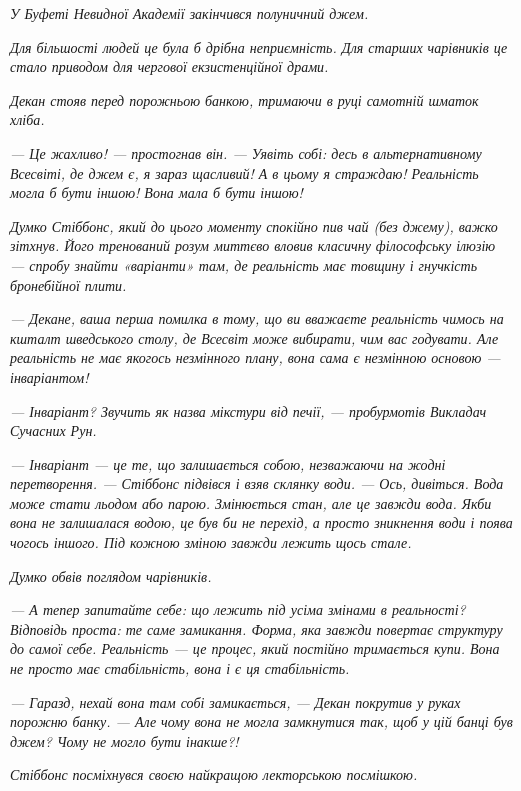 \documentclass[12pt, a4paper, openany]{book}
\begin{document}
\begin{terrybox}
\textit{У Буфеті Невидної Академії закінчився полуничний джем.}

\textit{Для більшості людей це була б дрібна неприємність. Для старших чарівників це стало приводом для чергової екзистенційної драми.}

\textit{Декан стояв перед порожньою банкою, тримаючи в руці самотній шматок хліба.}

\textit{--- Це жахливо! --- простогнав він. --- Уявіть собі: десь в альтернативному Всесвіті, де джем є, я зараз щасливий! А в цьому я страждаю! Реальність могла б бути іншою! Вона \emph{мала} б бути іншою!}

\textit{Думко Стіббонс, який до цього моменту спокійно пив чай (без джему), важко зітхнув. Його тренований розум миттєво вловив класичну філософську ілюзію --- спробу знайти «варіанти» там, де реальність має товщину і гнучкість бронебійної плити.}

\textit{--- Декане, ваша перша помилка в тому, що ви вважаєте реальність чимось на кшталт шведського столу, де Всесвіт може вибирати, чим вас годувати. Але реальність не має якогось незмінного плану, вона сама \emph{є} незмінною основою --- інваріантом!}

\textit{--- Інваріант? Звучить як назва мікстури від печії, --- пробурмотів Викладач Сучасних Рун.}

\textit{--- Інваріант --- це те, що залишається собою, незважаючи на жодні перетворення. --- Стіббонс підвівся і взяв склянку води. --- Ось, дивіться. Вода може стати льодом або парою. Змінюється стан, але це завжди вода. Якби вона не залишалася водою, це був би не перехід, а просто зникнення води і поява чогось іншого. Під кожною зміною завжди лежить щось стале.}

\textit{Думко обвів поглядом чарівників.}

\textit{--- А тепер запитайте себе: що лежить під \emph{усіма} змінами в реальності? Відповідь проста: те саме замикання. Форма, яка завжди повертає структуру до самої себе. Реальність --- це процес, який постійно тримається купи. Вона не просто має стабільність, вона і є ця стабільність.}

\textit{--- Гаразд, нехай вона там собі замикається, --- Декан покрутив у руках порожню банку. --- Але чому вона не могла замкнутися так, щоб у цій банці був джем? Чому не могло бути інакше?!}

\textit{Стіббонс посміхнувся своєю найкращою лекторською посмішкою.}


\end{terrybox}
\end{document}
